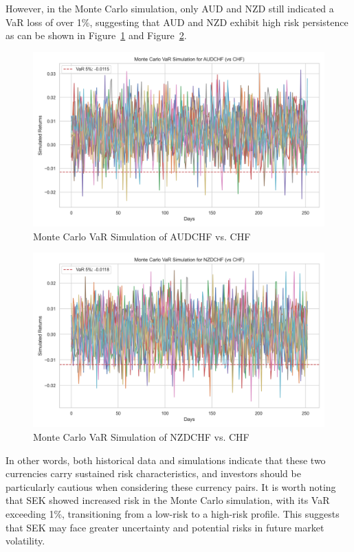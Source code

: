 \documentclass{article}
\begin{document}
However, in the Monte Carlo simulation, only AUD and NZD still indicated a VaR loss of over 1\%, suggesting that AUD and NZD exhibit high risk persistence as can be shown in Figure~\ref{fig:monte_carlo_var_simulation_AUDCHF_vs_CHF} and Figure~\ref{fig:monte_carlo_var_simulation_NZDCHF_vs_CHF}.

\begin{figure}[h]
    \centering   
    \includegraphics[width=0.75\linewidth]{reports/figures/monte_carlo_var_simulation_AUDCHF_vs_CHF.png}
    \caption{Monte Carlo VaR Simulation of AUDCHF vs. CHF}  \label{fig:monte_carlo_var_simulation_AUDCHF_vs_CHF}
\end{figure}

\begin{figure}[h]
    \centering
    \includegraphics[width=0.75\linewidth]{reports/figures/monte_carlo_var_simulation_NZDCHF_vs_CHF.png}
    \caption{Monte Carlo VaR Simulation of NZDCHF vs. CHF}  \label{fig:monte_carlo_var_simulation_NZDCHF_vs_CHF}
\end{figure}

In other words, both historical data and simulations indicate that these two currencies carry sustained risk characteristics, and investors should be particularly cautious when considering these currency pairs. It is worth noting that SEK showed increased risk in the Monte Carlo simulation, with its VaR exceeding 1\%, transitioning from a low-risk to a high-risk profile. This suggests that SEK may face greater uncertainty and potential risks in future market volatility.
\end{document}
